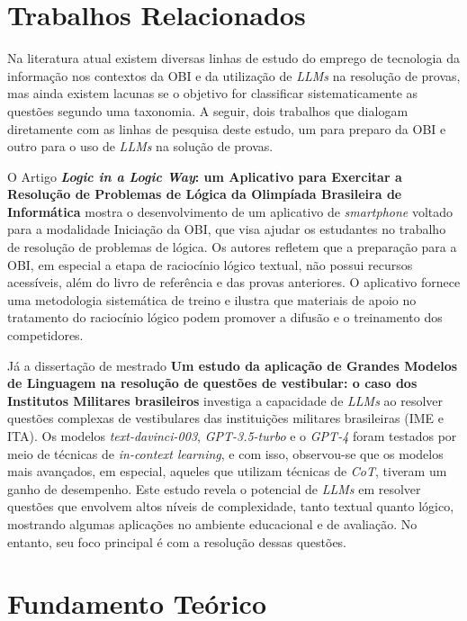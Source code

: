 \documentclass[12pt]{article}
\begin{document}
\section{Trabalhos Relacionados}\label{sec:trabalhos}

Na literatura atual existem diversas linhas de estudo do emprego de tecnologia da informação nos contextos da OBI e da utilização de \textit{LLMs} na resolução de provas, mas ainda existem lacunas se o objetivo for classificar sistematicamente as questões segundo uma taxonomia. A seguir, dois trabalhos que dialogam diretamente com as linhas de pesquisa deste estudo, um para preparo da OBI e outro para o uso de \textit{LLMs} na solução de provas.

O Artigo \textbf{\textit{Logic in a Logic Way}: um Aplicativo para Exercitar a Resolução de Problemas de Lógica da Olimpíada Brasileira de Informática} \cite{conferencia1} mostra o desenvolvimento de um aplicativo de \textit{smartphone} voltado para a modalidade Iniciação da OBI, que visa ajudar os estudantes no trabalho de resolução de problemas de lógica. Os autores refletem que a preparação para a OBI, em especial a etapa de raciocínio lógico textual, não possui recursos acessíveis, além do livro de referência e das provas anteriores. O aplicativo fornece uma metodologia sistemática de treino e ilustra que materiais de apoio no tratamento do raciocínio lógico podem promover a difusão e o treinamento dos competidores.

Já a dissertação de mestrado \textbf{Um estudo da aplicação de Grandes Modelos de Linguagem na resolução de questões de vestibular: o caso dos Institutos Militares brasileiros}\cite{msthesis1} investiga a capacidade de \textit{LLMs} ao resolver questões complexas de vestibulares das instituições militares brasileiras (IME e ITA). Os modelos \textit{text-davinci-003}, \textit{GPT-3.5-turbo} e o \textit{GPT-4} foram testados por meio de técnicas de \textit{in-context learning}, e com isso, observou-se que os modelos mais avançados, em especial, aqueles que utilizam técnicas de \textit{CoT}, tiveram um ganho de desempenho. Este estudo revela o potencial de \textit{LLMs} em resolver questões que envolvem altos níveis de complexidade, tanto textual quanto lógico, mostrando algumas aplicações no ambiente educacional e de avaliação. No entanto, seu foco principal é com a resolução dessas questões.

\section{Fundamento Teórico} \label{sec:fundamento}
\end{document}

